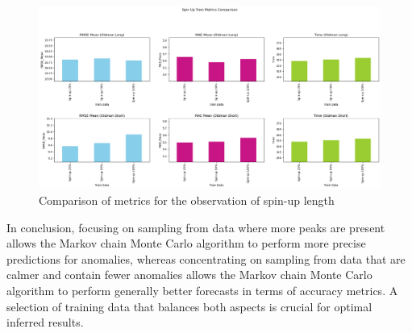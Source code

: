 \begin{figure}[H]
    \centering
    \includegraphics[width=.8\textwidth]{figures/time_series_analysis/comparison/spin_up.png}
    \captionsetup{width=.8\textwidth}
    \caption{Comparison of metrics for the observation of spin-up length}
    \label{fig:enter-label}
\end{figure}

In conclusion, focusing on sampling from data where more peaks are present allows the Markov chain Monte Carlo algorithm to perform more precise predictions for anomalies, whereas concentrating on sampling from data that are calmer and contain fewer anomalies allows the Markov chain Monte Carlo algorithm to perform generally better forecasts in terms of accuracy metrics. A selection of training data that balances both aspects is crucial for optimal inferred results.

